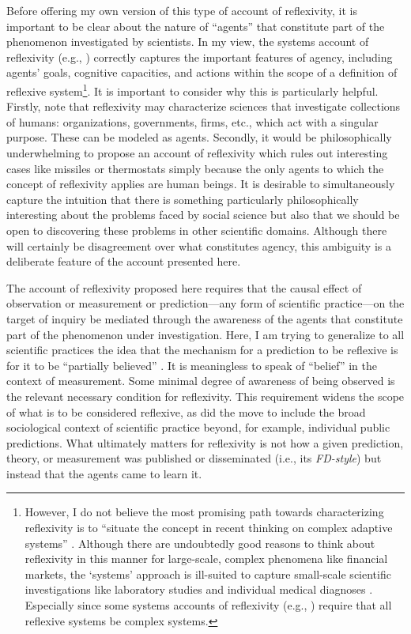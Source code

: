 Before offering my own version of this type of account of reflexivity, it is important to be clear about the nature of ``agents'' that constitute part of the phenomenon investigated by scientists. In my view, the systems account of reflexivity (e.g., \cite{beinhocker2013,soros2013}) correctly captures the important features of agency, including agents' goals, cognitive capacities, and actions within the scope of a definition of reflexive system\footnote{However, I do not believe the most promising path towards characterizing reflexivity is to ``situate the concept in recent thinking on complex adaptive systems'' \autocite[p331]{beinhocker2013}. Although there are undoubtedly good reasons to think about reflexivity in this manner for large-scale, complex phenomena like financial markets, the `systems' approach is ill-suited to capture small-scale scientific investigations like laboratory studies \autocite{luce95} and individual medical diagnoses \autocite{hacking1995}. Especially since some systems accounts of reflexivity (e.g., \cite[p332]{beinhocker2013}) require that all reflexive systems be complex systems.}. It is important to consider why this is particularly helpful. Firstly, note that reflexivity may characterize sciences that investigate collections of humans: organizations, governments, firms, etc., which act with a singular purpose. These can be modeled as agents. Secondly, it would be philosophically underwhelming to propose an account of reflexivity which rules out interesting cases like missiles \autocite{grunbaum1963} or thermostats \autocite{beinhocker2013} simply because the only agents to which the concept of reflexivity applies are human beings. It is desirable to simultaneously capture the intuition that there is something particularly philosophically interesting about the problems faced by social science but also that we should be open to discovering these problems in other scientific domains. Although there will certainly be disagreement over what constitutes agency, this ambiguity is a deliberate feature of the account presented here.

The account of reflexivity proposed here requires that the causal effect of observation or measurement or prediction---any form of scientific practice---on the target of inquiry be mediated through the awareness of the agents that constitute part of the phenomenon under investigation. Here, I am trying to generalize to all scientific practices the idea that the mechanism for a prediction to be reflexive is for it to be ``partially believed'' \autocite[above]{grunberg1986}. It is meaningless to speak of ``belief'' in the context of measurement. Some minimal degree of awareness of being observed is the relevant necessary condition for reflexivity. This requirement widens the scope of what is to be considered reflexive, as did the move to include the broad sociological context of scientific practice beyond, for example, individual public predictions. What ultimately matters for reflexivity is not how a given prediction, theory, or measurement was published or disseminated (i.e., its \textit{FD-style}) but instead that the agents came to learn it. 

